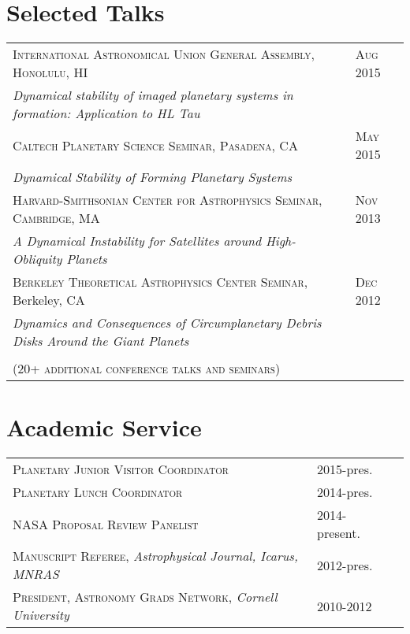 \documentclass[10pt]{article} %
\begin{document}

\section{Selected Talks}

\begin{tabular}{l>{\hfill}p{2.0cm}}
\textsc{International Astronomical Union General Assembly, Honolulu, HI} & \textsc{Aug} 2015\\
{\it Dynamical stability of imaged planetary systems in formation: Application to HL Tau}  \\
\textsc{Caltech Planetary Science Seminar, Pasadena, CA} & \textsc{May} 2015\\
{\it Dynamical Stability of Forming Planetary Systems}  \\
\textsc{Harvard-Smithsonian Center for Astrophysics Seminar, Cambridge, MA} & \textsc{Nov} 2013\\
{\it A Dynamical Instability for Satellites around High-Obliquity Planets}  \\
\textsc{Berkeley Theoretical Astrophysics Center Seminar}, Berkeley, CA & \textsc{Dec} 2012 \\
{\it Dynamics and Consequences of Circumplanetary Debris Disks Around the Giant Planets} \\
\\
\textsc{(20+ additional conference talks and seminars)}
\end{tabular}


\section{Academic Service}

\begin{tabular}{l>{\hfill}p{4.5cm}r}
\textsc{Planetary Junior Visitor Coordinator} & 2015-pres. \\
\textsc{Planetary Lunch Coordinator} & 2014-pres. \\
\textsc{NASA Proposal Review Panelist} & 2014-present.\\
\textsc{Manuscript Referee}, {\it Astrophysical Journal, Icarus, MNRAS} & 2012-pres.\\
\textsc{President, Astronomy Grads Network}, {\it Cornell University} & 2010-2012\\
\end{tabular}
\end{document}
